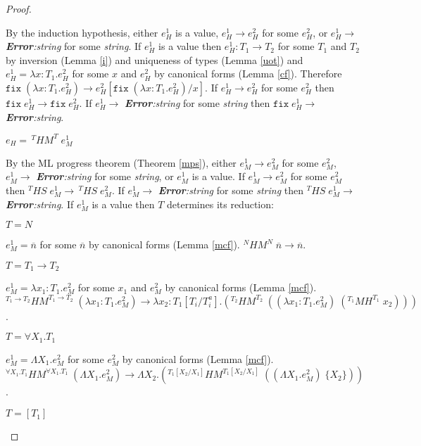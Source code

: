 \begin{theorem}
\begin{proof}
\begin{case}
By the induction hypothesis, either $e_{H}^{1}$ is a value, $e_{H}^{1}\rightarrow e_{H}^{2}$ for some $e_{H}^{2}$, or $e_{H}^{1}\rightarrow$ \emph{\textbf{Error}:\;string} for some \emph{string}.  If $e_{H}^{1}$ is a value then $e_{H}^{1}:T_{1}\rightarrow T_{2}$ for some $T_{1}$ and $T_{2}$ by inversion (Lemma \ref{i}) and uniqueness of types (Lemma \ref{uot}) and $e_{H}^{1}=\lambda x:T_{1}.e_{H}^{2}$ for some $x$ and $e_{H}^{2}$ by canonical forms (Lemma \ref{cf}).  Therefore $\mathtt{fix}\;(\lambda x:T_{1}.e_{H}^{2})\rightarrow e_{H}^{2}[\mathtt{fix}\;(\lambda x:T_{1}.e_{H}^{2})/x]$.  If $e_{H}^{1}\rightarrow e_{H}^{2}$ for some $e_{H}^{2}$ then $\mathtt{fix}\;e_{H}^{1}\rightarrow\mathtt{fix}\;e_{H}^{2}$.  If $e_{H}^{1}\rightarrow$ \emph{\textbf{Error}:\;string} for some \emph{string} then $\mathtt{fix}\;e_{H}^{1}\rightarrow$ \emph{\textbf{Error}:\;string}.
\end{case}
\begin{case}
$e_{H}=\,^{T}HM^{T}\;e_{M}^{1}$

By the ML progress theorem (Theorem \ref{mps}), either $e_{M}^{1}\rightarrow e_{M}^{2}$ for some $e_{M}^{2}$, $e_{M}^{1}\rightarrow$ \emph{\textbf{Error}:\;string} for some \emph{string}, or $e_{M}^{1}$ is a value.  If $e_{M}^{1}\rightarrow e_{M}^{2}$ for some $e_{M}^{2}$ then $^{T}HS\;e_{M}^{1}\rightarrow\,^{T}HS\;e_{M}^{2}$.  If $e_{M}^{1}\rightarrow$ \emph{\textbf{Error}:\;string} for some \emph{string} then $^{T}HS\;e_{M}^{1}\rightarrow$ \emph{\textbf{Error}:\;string}.  If $e_{M}^{1}$ is a value then $T$ determines its reduction:
\begin{case}
$T=N$

$e_{M}^{1}=\overline{n}$ for some $\overline{n}$ by canonical forms (Lemma \ref{mcf}).  $^{N}HM^{N}\;\overline{n}\rightarrow\overline{n}$.
\end{case}
\begin{case}
$T=T_{1}\rightarrow T_{2}$

$e_{M}^{1}=\lambda x_{1}:T_{1}.e_{M}^{2}$ for some $x_{1}$ and $e_{M}^{2}$ by canonical forms (Lemma \ref{mcf}).  $^{T_{1}\rightarrow T_{2}}HM^{T_{1}\rightarrow T_{2}}\;(\lambda x_{1}:T_{1}.e_{M}^{2})\rightarrow\lambda x_{2}:T_{1}[T_{i}/T^{a}_{i}].(^{T_{2}}HM^{T_{2}}\;((\lambda x_{1}:T_{1}.e_{M}^{2})\;(^{T_{1}}MH^{T_{1}}\;x_{2})))$.
\end{case}
\begin{case}
$T=\forall X_{1}.T_{1}$

$e_{M}^{1}=\Lambda X_{1}.e_{M}^{2}$ for some $e_{M}^{2}$ by canonical forms (Lemma \ref{mcf}).  $^{\forall X_{1}.T_{1}}HM^{\forall X_{1}.T_{1}}\;(\Lambda X_{1}.e_{M}^{2})\rightarrow\Lambda X_{2}.(^{T_{1}[X_{2}/X_{1}]}HM^{T_{1}[X_{2}/X_{1}]}\;((\Lambda X_{1}.e_{M}^{2})\;\lbrace X_{2}\rbrace))$.
\end{case}
\begin{case}
$T=[T_{1}]$


\end{case}
\end{case}
\end{proof}
\end{theorem}
